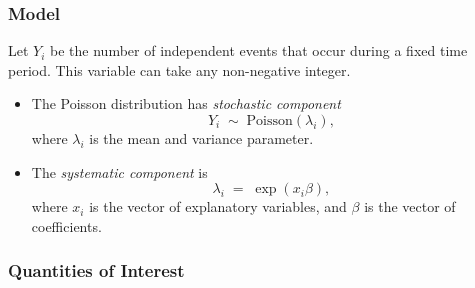 \documentclass{article}
\begin{document}
\subsubsection{Model}
Let $Y_i$ be the number of independent events that occur during a
fixed time period. This variable can take any non-negative integer.

\begin{itemize}
\item The Poisson distribution has \emph{stochastic component}
  \begin{equation*}
    Y_i \; \sim \; \textrm{Poisson}(\lambda_i),
  \end{equation*}
  where $\lambda_i$ is the mean and variance parameter.
  
\item The \emph{systematic component} is 
  \begin{equation*}
    \lambda_i \; = \; \exp(x_i \beta),
  \end{equation*}
  where $x_i$ is the vector of explanatory variables, and $\beta$ is
  the vector of coefficients.
\end{itemize}

\subsubsection{Quantities of Interest}
\end{document}
